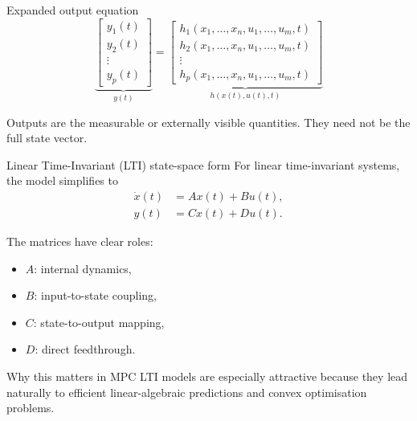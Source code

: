 \documentclass[aspectratio=169,10pt]{beamer}
\begin{document}
\begin{frame}{Expanded output equation}
\[
\underbrace{
\begin{bmatrix}
y_1(t)\\
y_2(t)\\
\vdots\\
y_p(t)
\end{bmatrix}}_{y(t)}
=
\underbrace{
\begin{bmatrix}
h_1(x_1,\dots,x_n,u_1,\dots,u_m,t)\\
h_2(x_1,\dots,x_n,u_1,\dots,u_m,t)\\
\vdots\\
h_p(x_1,\dots,x_n,u_1,\dots,u_m,t)
\end{bmatrix}}_{h(x(t),u(t),t)}
\]

Outputs are the measurable or externally visible quantities.
They need not be the full state vector.
\end{frame}

\begin{frame}{Linear Time-Invariant (LTI) state-space form}
For linear time-invariant systems, the model simplifies to
\begin{align*}
\dot{x}(t) &= A x(t) + B u(t),\\
y(t) &= C x(t) + D u(t).
\end{align*}

The matrices have clear roles:
\begin{itemize}
  \item \(A\): internal dynamics,
  \item \(B\): input-to-state coupling,
  \item \(C\): state-to-output mapping,
  \item \(D\): direct feedthrough.
\end{itemize}

\begin{notebox}{Why this matters in MPC}
LTI models are especially attractive because they lead naturally to efficient linear-algebraic predictions and convex optimisation problems.
\end{notebox}
\end{frame}
\end{document}
